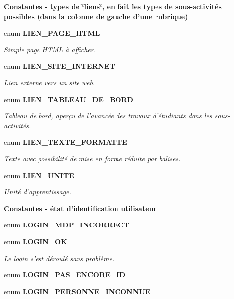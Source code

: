 \begin{Indent}{\bf Constantes - types de \char`\"{}liens\char`\"{}, en fait les types de sous-activités possibles (dans la colonne de gauche d'une rubrique)}
\begin{CompactItemize}
enum {\bf LIEN\_\-PAGE\_\-HTML} 
\begin{CompactList}\small\item\em Simple page HTML à afficher. \item\end{CompactList}\item 
enum {\bf LIEN\_\-SITE\_\-INTERNET} 
\begin{CompactList}\small\item\em Lien externe vers un site web. \item\end{CompactList}\item 
enum {\bf LIEN\_\-TABLEAU\_\-DE\_\-BORD} 
\begin{CompactList}\small\item\em Tableau de bord, aperçu de l'avancée des travaux d'étudiants dans les sous-activités. \item\end{CompactList}\item 
enum {\bf LIEN\_\-TEXTE\_\-FORMATTE} 
\begin{CompactList}\small\item\em Texte avec possibilité de mise en forme réduite par balises. \item\end{CompactList}\item 
enum {\bf LIEN\_\-UNITE} 
\begin{CompactList}\small\item\em Unité d'apprentissage. \item\end{CompactList}\end{CompactItemize}
\end{Indent}
\begin{Indent}{\bf Constantes - état d'identification utilisateur}\par
\begin{CompactItemize}
\item 
enum \textbf{LOGIN\_\-MDP\_\-INCORRECT} 
\item 
enum {\bf LOGIN\_\-OK} 
\begin{CompactList}\small\item\em Le login s'est déroulé sans problème. \item\end{CompactList}\item 
enum \textbf{LOGIN\_\-PAS\_\-ENCORE\_\-ID} 
\item 
enum \textbf{LOGIN\_\-PERSONNE\_\-INCONNUE} 
\end{CompactItemize}
\end{Indent}
